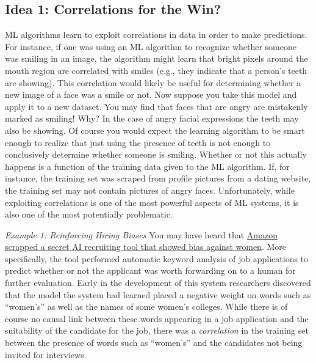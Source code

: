 \documentclass[assignment01_Solutions]{subfiles}
\begin{document}
\subsection*{Idea 1: Correlations for the Win?}
ML algorithms learn to exploit correlations in data in order to make predictions.  For instance, if one was using an ML algorithm to recognize whether someone was smiling in an image, the algorithm might learn that bright pixels around the mouth region are correlated with smiles (e.g., they indicate that a person's teeth are showing).  This correlation would likely be useful for determining whether a new image of a face was a smile or not.  Now suppose you take this model and apply it to a new dataset.  You may find that faces that are angry are mistakenly marked as smiling!  Why?  In the case of angry facial expressions the teeth may also be showing.  Of course you would expect the learning algorithm to be smart enough to realize that just using the presence of teeth is not enough to conclusively determine whether someone is smiling.  Whether or not this actually happens is a function of the training data given to the ML algorithm.  If, for instance, the training set was scraped from profile pictures from a dating website, the training set may not contain pictures of angry faces.  Unfortunately, while exploiting correlations is one of the most powerful aspects of ML systems, it is also one of the most potentially problematic.


\bi

\item \emph{Example 1: Reinforcing Hiring Biases}
You may have heard that \href{https://www.reuters.com/article/us-amazon-com-jobs-automation-insight/amazon-scraps-secret-ai-recruiting-tool-that-showed-bias-against-women-idUSKCN1MK08G}{Amazon scrapped a secret AI recruiting tool that showed bias against women}.  More specifically, the tool performed automatic keyword analysis of job applications to predict whether or not the applicant was worth forwarding on to a human for further evaluation.  Early in the development of this system researchers discovered that the model the system had learned placed a negative weight on words such as ``women's'' as well as the names of some women's colleges.  While there is of course no causal link between these words appearing in a job application and the suitability of the candidate for the job, there was a \emph{correlation} in the training set between the presence of words such as ``women's'' and the candidates not being invited for interviews.
\end{document}
